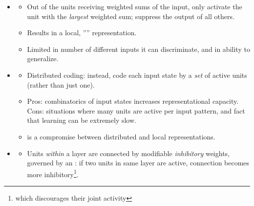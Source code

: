 \documentclass[12pt]{article}
\begin{document}
\begin{itemize}
	\item {}
	\begin{itemize}
		\item Out of the units receiving weighted sums of the input, only activate the unit with the \emph{largest} weighted sum; suppress the output of all others. 
		\item Results in a local, '''' representation. 
		\item Limited in number of different inputs it can discriminate, and in ability to generalize. 
	\end{itemize}
	\newpage
	\item {}
	\begin{itemize}
		\item Distributed coding: instead, code each input state by a \emph{set} of active units (rather than just one). 
		\item Pros: combinatorics of input states increases representational capacity. Cons: situations where many units are active per input pattern, and fact that learning can be extremely slow. 
		\item {} is a compromise between distributed and local representations. 
	\end{itemize}
	
	\item {}
	\begin{itemize}
		\item Units \textit{within} a layer are connected by modifiable \emph{inhibitory} weights, governed by an : if two units in same layer are active, connection becomes more inhibitory\footnote{which discourages their joint activity}. 
	\end{itemize}
\end{itemize}

\end{document}

